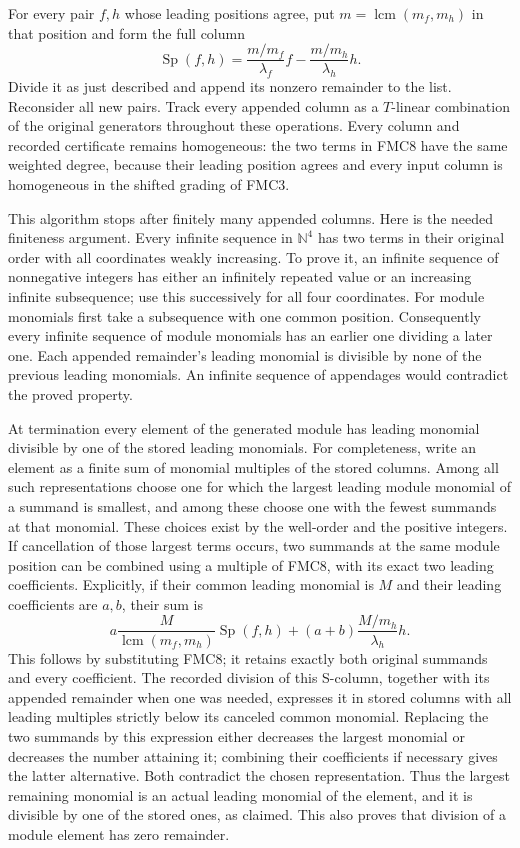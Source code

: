 \documentclass[11pt,a4paper]{article}
\begin{document}
For every pair $f,h$ whose leading positions agree, put
$m=\operatorname{lcm}(m_f,m_h)$ in that position and form the full
column
\[
 \operatorname{Sp}(f,h)=
      \frac{m/m_f}{\lambda_f}f
                  -\frac{m/m_h}{\lambda_h}h.
 \tag{FMC8}
\]
Divide it as just described and append its nonzero remainder to the
list. Reconsider all new pairs. Track every appended column as a
$T$-linear combination of the original generators throughout these
operations. Every column and recorded certificate remains homogeneous:
the two terms in FMC8 have the same weighted degree, because their
leading position agrees and every input column is homogeneous in the
shifted grading of FMC3.

This algorithm stops after finitely many appended columns. Here is the
needed finiteness argument. Every infinite sequence in $\mathbb N^4$
has two terms in their original order with all coordinates weakly
increasing. To prove it, an infinite sequence of nonnegative integers
has either an infinitely repeated value or an increasing infinite
subsequence; use this successively for all four coordinates. For
module monomials first take a subsequence with one common position.
Consequently every infinite sequence of module monomials has an earlier
one dividing a later one. Each appended remainder's leading monomial
is divisible by none of the previous leading monomials. An infinite
sequence of appendages would contradict the proved property.

At termination every element of the generated module has leading
monomial divisible by one of the stored leading monomials. For
completeness, write an element as a finite sum of monomial multiples
of the stored columns. Among all such representations choose one for
which the largest leading module monomial of a summand is smallest,
and among these choose one with the fewest summands at that monomial.
These choices exist by the well-order and the positive integers.
If cancellation of those largest terms occurs, two summands at the
same module position can be combined using a multiple of FMC8,
with its exact two leading coefficients. Explicitly, if their
common leading monomial is $M$ and their leading coefficients are
$a,b$, their sum is
\[
 a\frac{M}{\operatorname{lcm}(m_f,m_h)}\operatorname{Sp}(f,h)
       +(a+b)\frac{M/m_h}{\lambda_h}h.
\]
This follows by substituting FMC8; it retains exactly both original
summands and every coefficient. The recorded division of
this S-column, together with its appended remainder when one was
needed, expresses it in stored columns with all
leading multiples strictly below its canceled common monomial.
Replacing the two summands by this expression either decreases the
largest monomial or decreases the number attaining it; combining
their coefficients if necessary gives the latter alternative.
Both contradict the chosen representation. Thus the largest
remaining monomial is an actual leading monomial of the element,
and it is divisible by one of the stored ones, as claimed.
This also proves that division of a module element has zero remainder.
\end{document}
